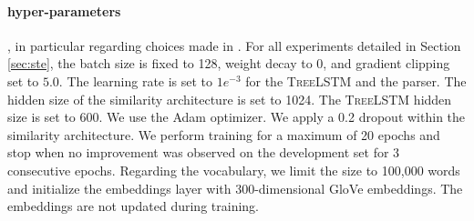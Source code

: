 \paragraph{hyper-parameters} , in particular regarding choices made in \textcite{choi_18}. For all experiments detailed in Section \ref{sec:ste}, the batch size is fixed to 128, weight decay to $0$, and gradient clipping set to $5.0$. The learning rate is set to $1e^{-3}$ for the \textsc{TreeLSTM} and the parser. The hidden size of the similarity architecture is set to 1024. The \textsc{TreeLSTM} hidden size is set to 600. We use the Adam optimizer. We apply a 0.2 dropout within the similarity architecture. We perform training for a maximum of 20 epochs and stop when no improvement was observed on the development set for 3 consecutive epochs.
Regarding the vocabulary, we limit the size to 100,000 words  and initialize the embeddings layer with 300-dimensional GloVe embeddings. The embeddings are not updated during training. %

